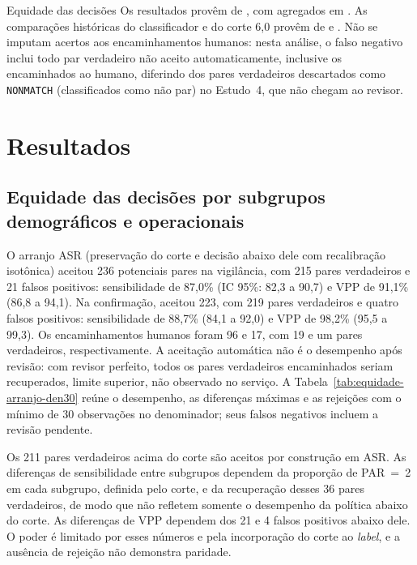 \begin{chapter}{Equidade das decisões}
Os resultados provêm de , com agregados em . As comparações históricas do classificador e do corte 6,0 provêm de  e . Não se imputam acertos aos encaminhamentos humanos: nesta análise, o falso negativo inclui todo par verdadeiro não aceito automaticamente, inclusive os encaminhados ao humano, diferindo dos pares verdadeiros descartados como \texttt{NONMATCH} (classificados como não par) no Estudo~4, que não chegam ao revisor.

\section{Resultados}\label{sec:e5-resultados}

\subsection{Equidade das decisões por subgrupos demográficos e operacionais}\label{sec:e5-resultados-equidade}

O arranjo ASR (preservação do corte e decisão abaixo dele com recalibração isotônica) aceitou 236 potenciais pares na vigilância, com 215 pares verdadeiros e 21 falsos positivos: sensibilidade de 87,0\% (IC 95\%: 82,3 a 90,7) e VPP de 91,1\% (86,8 a 94,1). Na confirmação, aceitou 223, com 219 pares verdadeiros e quatro falsos positivos: sensibilidade de 88,7\% (84,1 a 92,0) e VPP de 98,2\% (95,5 a 99,3). Os encaminhamentos humanos foram 96 e 17, com 19 e um pares verdadeiros, respectivamente. A aceitação automática não é o desempenho após revisão: com revisor perfeito, todos os pares verdadeiros encaminhados seriam recuperados, limite superior, não observado no serviço. A Tabela~\ref{tab:equidade-arranjo-den30} reúne o desempenho, as diferenças máximas e as rejeições com o mínimo de 30 observações no denominador; seus falsos negativos incluem a revisão pendente.



Os 211 pares verdadeiros acima do corte são aceitos por construção em ASR. As diferenças de sensibilidade entre subgrupos dependem da proporção de PAR~=~2 em cada subgrupo, definida pelo corte, e da recuperação desses 36 pares verdadeiros, de modo que não refletem somente o desempenho da política abaixo do corte. As diferenças de VPP dependem dos 21 e 4 falsos positivos abaixo dele. O poder é limitado por esses números e pela incorporação do corte ao \textit{label}, e a ausência de rejeição não demonstra paridade.


\end{chapter}
